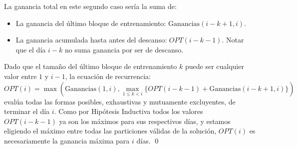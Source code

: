 La ganancia total en este segundo caso sería la suma de:
\begin{itemize}
    \item La ganancia del último bloque de entrenamiento: $\text{Ganancias}(i-k+1, i)$.
    \item La ganancia acumulada hasta antes del descanso: $OPT(i-k-1)$. Notar que el día $i-k$ no suma ganancia por ser de descanso.
\end{itemize}

Dado que el tamaño del último bloque de entrenamiento $k$ puede ser cualquier valor entre $1$ y $i-1$, la ecuación de recurrencia:
\[
OPT(i) = \max \left( \text{Ganancias}(1, i), \max_{1 \le k < i} \{ OPT(i-k-1) + \text{Ganancias}(i-k+1, i) \} \right)
\]
evalúa todas las formas posibles, exhaustivas y mutuamente excluyentes, de terminar el día $i$. Como por Hipótesis Inductiva todos los valores $OPT(i-k-1)$ ya son los máximos para sus respectivos días, y estamos eligiendo el máximo entre todas las particiones válidas de la solución, $OPT(i)$ es necesariamente la ganancia máxima para $i$ días. \qed